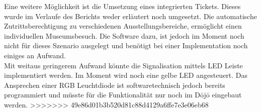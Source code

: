 Eine weitere Möglichkeit ist die Umsetzung eines integrierten Tickets. Dieses wurde im Verlaufe des Berichts weder erläutert noch umgesetzt. Die automatische Zutrittsberechtigung zu verschiedenen Ausstellungsbereiche, ermöglicht einen individuellen Museumsbesuch. Die Software dazu, ist jedoch im Moment noch nicht für dieses Szenario ausgelegt und benötigt bei einer Implementation noch einiges an Aufwand.\\
Mit weitaus geringerem Aufwand könnte die Signalisation mittels LED Leiste implementiert werden. Im Moment wird noch eine gelbe LED angesteuert. Das Ansprechen einer RGB Leuchtdiode ist softwaretechnisch jedoch bereits programmiert und müsste für die Funktionalität nur noch im Dōjō eingebaut werden.
>>>>>>> 49e86d01b3b520d81c88d4129a6ffe7e3e06eb68
